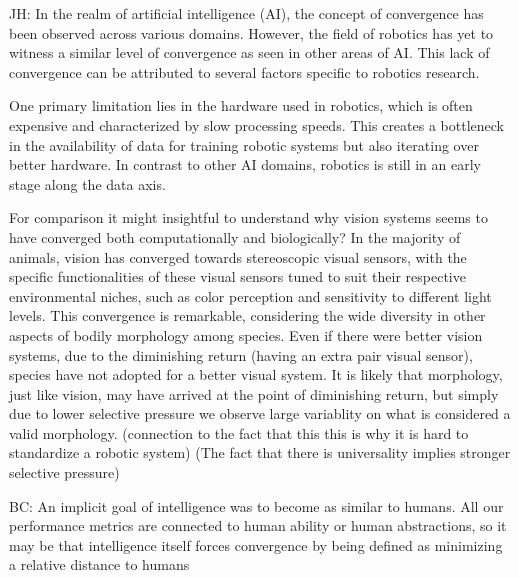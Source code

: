 \documentclass{article}
\newcommand{\jh}[1]{{\;\color{red}JH: #1}}
\newcommand{\bc}[1]{{\color{olive}BC: #1}}
\theoremstyle{plain}
\theoremstyle{definition}
\theoremstyle{remark}
\begin{document}
\jh{
In the realm of artificial intelligence (AI), the concept of convergence has been observed across various domains. However, the field of robotics has yet to witness a similar level of convergence as seen in other areas of AI. This lack of convergence can be attributed to several factors specific to robotics research.

One primary limitation lies in the hardware used in robotics, which is often expensive and characterized by slow processing speeds. This creates a bottleneck in the availability of data for training robotic systems but also iterating over better hardware. In contrast to other AI domains, robotics is still in an early stage along the data axis. 

For comparison it might insightful to understand why vision systems seems to have converged both computationally and biologically? In the majority of animals, vision has converged towards stereoscopic visual sensors, with the specific functionalities of these visual sensors tuned to suit their respective environmental niches, such as color perception and sensitivity to different light levels. This convergence is remarkable, considering the wide diversity in other aspects of bodily morphology among species. Even if there were better vision systems, due to the diminishing return (\eg having an extra pair visual sensor), species have not adopted for a better visual system. It is likely that morphology, just like vision, may have arrived at the point of diminishing return, but simply due to lower selective pressure we observe large variablity on what is considered a valid morphology. 
(connection to the fact that this this is why it is hard to standardize a robotic system)
(The fact that there is universality implies stronger selective pressure)
}

\bc{An implicit goal of intelligence was to become as similar to humans. All our performance metrics are connected to human ability or human abstractions, so it may be that intelligence itself forces convergence by being defined as minimizing a relative distance to humans}
\end{document}
